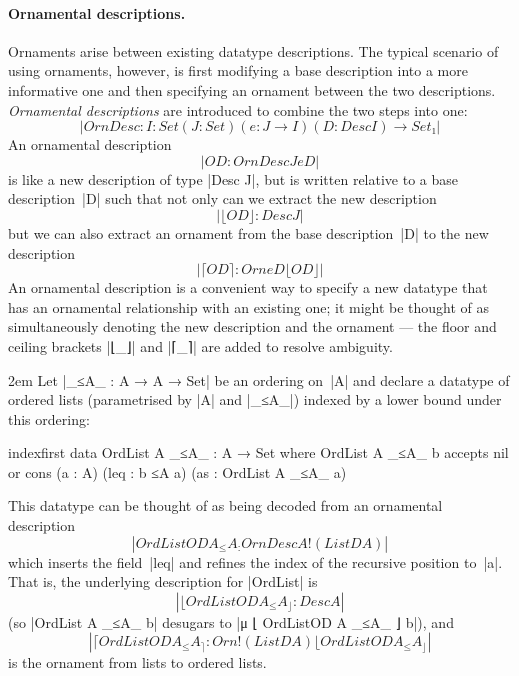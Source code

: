 \paragraph{Ornamental descriptions.}
Ornaments arise between existing datatype descriptions.
The typical scenario of using ornaments, however, is first modifying a base description into a more informative one and then specifying an ornament between the two descriptions.
\emph{Ornamental descriptions} are introduced to combine the two steps into one:
\[ |OrnDesc : {I : Set} (J : Set) (e : J → I) (D : Desc I) → Set₁| \]
An ornamental description
\[ |OD : OrnDesc J e D| \]
is like a new description of type |Desc J|, but is written relative to a base description~|D| such that not only can we extract the new description
\[ |⌊ OD ⌋ : Desc J| \]
but we can also extract an ornament from the base description~|D| to the new description
\[ |⌈ OD ⌉ : Orn e D ⌊ OD ⌋| \]
An ornamental description is a convenient way to specify a new datatype that has an ornamental relationship with an existing one; it might be thought of as simultaneously denoting the new description and the ornament --- the floor and ceiling brackets |⌊_⌋| and |⌈_⌉| are added to resolve ambiguity.

{\leftmargin2em
\noindent\underline{}\quad Let |_≤A_ : A → A → Set| be an ordering on~|A| and declare a datatype of ordered lists (parametrised by |A| and |_≤A_|) indexed by a lower bound under this ordering:
\begin{code}
indexfirst data OrdList A _≤A_ : A → Set where
  OrdList A _≤A_ b
    accepts  nil
    or       cons  (a : A) (leq : b ≤A a) (as : OrdList A _≤A_ a)
\end{code}
This datatype can be thought of as being decoded from an ornamental description
\[ |OrdListOD A _≤A_ : OrnDesc A ! (ListD A)| \]
which inserts the field~|leq| and refines the index of the recursive position to~|a|.
That is, the underlying description for |OrdList| is
\[ |⌊ OrdListOD A _≤A_ ⌋ : Desc A| \]
(so |OrdList A _≤A_ b| desugars to |μ ⌊ OrdListOD A _≤A_ ⌋ b|), and
\[ |⌈ OrdListOD A _≤A_ ⌉ : Orn ! (ListD A) ⌊ OrdListOD A _≤A_ ⌋| \]
is the ornament from lists to ordered lists.}
